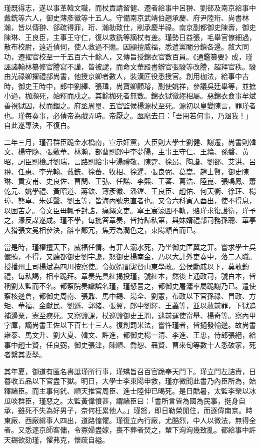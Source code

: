 \begin{pinyinscope}
瑾既得志，遂以事革韓文職，而杖責請留健、遷者給事中呂翀、劉郤及南京給事中戴銑等六人，御史薄彥徽等十五人。守備南京武靖伯趙承慶、府尹陸珩、尚書林瀚，皆以傳翀、郤疏得罪，珩、瀚勒致仕，削承慶半祿。南京副都御史陳壽，御史陳琳、王良臣，主事王守仁，復以救銑等謫杖有差。瑾勢日益張，毛舉官僚細過，散布校尉，遠近偵伺，使人救過不贍。因顓擅威福，悉遣黨閹分鎮各邊。敘大同功，遷擢官校至一千五百六十餘人，又傳旨授錦衣官數百員。《通鑑纂要》成，瑾誣諸翰林纂修官謄寫不謹，皆被譴，而命文華殿書辦官張駿等改謄，超拜官秩。駿由光祿卿擢禮部尚書，他授京卿者數人，裝潢匠役悉授官。創用枷法，給事中吉時，御史王時中，郎中劉繹、張瑋，尚寶卿顧璿，副使姚祥，參議吳廷舉等，並摭小過，枷瀕死，始釋而戍之。其餘枷死者無數。錦衣獄徽纆相屬。惡錦衣僉事牟斌善視獄囚，杖而錮之。府丞周璽、五官監候楊源杖至死。源初以皇變陳言，罪瑾者也。瑾每奏事，必偵帝為戲弄時。帝厭之。亟麾去曰：「吾用若何事，乃溷我！」自此遂專決，不復白。

二年三月，瑾召群臣跪金水橋南，宣示奸黨，大臣則大學士劉健、謝遷，尚書則韓文、楊守隨、張敷華、林瀚，部曹則郎中李夢陽，主事王守仁、王綸、孫磐、黃昭，詞臣則檢討劉瑞，言路則給事中湯禮敬、陳霆、徐昂、陶諧、劉郤、艾洪、呂翀、任惠、李光翰、戴銑、徐蕃、牧相、徐暹、張良弼、葛嵩、趙士賢，御史陳琳、貢安甫、史良佐、曹閔、王弘、任諾、李熙、王蕃、葛浩、陸崑、張鳴鳳、蕭乾元、姚學禮、黃昭道、蔣欽、薄彥徽、潘鏜、王良臣、趙佑、何天衢、徐玨、楊璋、熊卓、朱廷聲、劉玉等，皆海內號忠直者也。又令六科寅入酉出，使不得息，以困苦之。令文臣毋輒予封誥，痛繩文吏。寧王宸濠圖不軌，賂瑾求復護衛，瑾予之，濠反謀遂成。瑾不學，每批答章奏，皆持歸私第，與妹婿禮部司務孫聰、華亭大猾張文冕相參決，辭率鄙冗，焦芳為潤色之，東陽頫首而已。

當是時，瑾權擅天下，威福任情。有罪人溺水死，乃坐御史匡翼之罪。嘗求學士吳儼賄，不得，又聽都御史劉宇讒，怒御史楊南金，乃以大計外吏奏中，落二人職。授播州土司楊斌為四川按察使。令奴婿閭潔督山東學政。公侯勳戚以下，莫敢鈞禮，每私謁，相率跪拜。章奏先具紅揭投瑾，號紅本，然後上通政司，號白本，皆稱劉太監而不名。都察院奏讞誤名瑾，瑾怒詈之，都御史屠滽率屬跪謝乃已。遣使察核邊倉，都御史周南、張鼐、馬中錫、湯全、劉憲，布政以下官孫祿、冒政、方矩、華福、金獻民、劉遜、郭緒、張翼，郎中劉繹、王藎等，並以赦前罪，下獄追補邊粟，憲至瘐死。又察鹽課，杖巡鹽御史王潤，逮前運使甯舉、楊奇等。察內甲字庫，謫尚書王佐以下百七十三人。復創罰米法，嘗忤瑾者，皆擿發輸邊。故尚書雍泰、馬文升、劉大夏、韓文、許進，都御史楊一清、李進、王忠，侍郎張縉，給事中趙士賢，任良弼，御史張津，陳順、喬恕、聶賢、曹來旬等數十人悉破家，死者繫其妻孥。

其年夏，御道有匿名書詆瑾所行事，瑾矯旨召百官跪奉天門下。瑾立門左詰責，日暮收五品以下官盡下獄。明日，大學士李東陽申救，瑾亦微聞此書乃內臣所為，始釋諸臣。而主事何釴、順天推官周臣、進士陸伸已暍死。是日酷暑，太監李榮以冰瓜啖群臣，瑾惡之。太監黃偉憤甚，謂諸臣曰：「書所言皆為國為民事，挺身自承，雖死不失為好男子，奈何枉累他人。」瑾怒，即日勒榮閒住，而逐偉南京。時東廠、西廠緝事人四出，道路惶懼。瑾復立內行廠，尤酷烈，中人以微法，無得全者。又悉逐京師客傭，令寡婦盡嫁，喪不葬者焚之，輦下洶洶幾致亂。都給事中許天錫欲劾瑾，懼弗克，懷疏自縊。


\end{pinyinscope}
